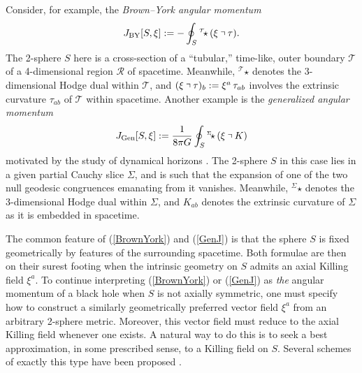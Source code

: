 \documentclass[12pt,letterpaper]{iopart}
\newcommand\defn[1]{{\slshape #1\/}}
\begin{document}
Consider, for example, the \defn{Brown--York angular momentum} 
%
\begin{equation}\label{BrownYork}
	J_{\mathrm{BY}}[S, \xi] := -\oint_{S} {}^{\scriptscriptstyle\mathcal{T}}\!\mathord{\star}\, (\xi \hook \tau).
\end{equation}
%
The 2-sphere $S$ here is a cross-section of a ``tubular,'' time-like, outer boundary $\mathcal{T}$ of a 4-dimensional region $\mathcal{R}$ of spacetime.  Meanwhile, ${}^{\scriptscriptstyle\mathcal{T}}\!\mathord{\star}$ denotes the 3-dimensional Hodge dual within $\mathcal{T}$, and $(\xi \hook \tau)_b := \xi^a\, \tau_{ab}$ involves the extrinsic curvature $\tau_{ab}$ of $\mathcal{T}$ within spacetime.  Another example is the \defn{generalized angular momentum} 
%
\begin{equation}\label{GenJ}
	J_{\mathrm{Gen}}[S, \xi] := \frac{1}{8 \pi G} \oint_S {}^{\scriptscriptstyle\Sigma}\!\mathord{\star}\, (\xi \hook K) 
\end{equation}
%
motivated by the study of dynamical horizons \cite{Ashtekar2003, Ashtekar2004}.  The 2-sphere $S$ in this case lies in a given partial Cauchy slice $\Sigma$, and is such that the expansion of one of the two null geodesic congruences emanating from it vanishes.  Meanwhile, ${}^{\scriptscriptstyle\Sigma}\!\mathord{\star}$ denotes the 3-dimensional Hodge dual within $\Sigma$, and $K_{ab}$ denotes the extrinsic curvature of $\Sigma$ as it is embedded in spacetime.

The common feature of (\ref{BrownYork}) and (\ref{GenJ}) is that the sphere $S$ is fixed geometrically by features of the surrounding spacetime.  Both formulae are then on their surest footing when the intrinsic geometry on $S$ admits an axial Killing field $\xi^a$.  To continue interpreting (\ref{BrownYork}) or (\ref{GenJ}) as \textit{the} angular momentum of a black hole when $S$ is not axially symmetric, one must specify how to construct a similarly geometrically preferred vector field $\xi^a$ from an arbitrary 2-sphere metric.  Moreover, this vector field must reduce to the axial Killing field whenever one exists.  A natural way to do this is to seek a best approximation, in some prescribed sense, to a Killing field on $S$.  Several schemes of exactly this type have been proposed \cite{Matzner, CookWhiting, Lovelace, Beetle, Dreyer, Harte}.
\end{document}

